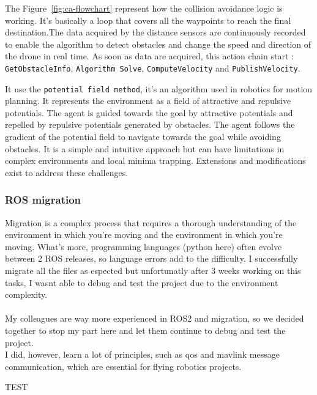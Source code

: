 \hfill \break

The Figure~\ref{fig:ca-flowchart} represent how the collision avoidance logic is working.
It's basically a loop that covers all the waypoints to reach the final destination.The data acquired by the distance sensors are continuously recorded to enable the algorithm to detect obstacles and change the speed and direction of the drone in real time.
As soon as data are acquired, this action chain start : \texttt{GetObstacleInfo}, \texttt{Algorithm Solve}, \texttt{ComputeVelocity} and \texttt{PublishVelocity}.
\newpage

It use the \texttt{potential field method}\cite{potential_field}, it's an algorithm used in robotics for motion planning. It represents the environment as a field of attractive and repulsive potentials. The agent is guided towards the goal by attractive potentials and repelled by repulsive potentials generated by obstacles. The agent follows the gradient of the potential field to navigate towards the goal while avoiding obstacles.
It is a simple and intuitive approach but can have limitations in complex environments and local minima trapping. Extensions and modifications exist to address these challenges.

\subsubsection{ ROS migration}
Migration is a complex process that requires a thorough understanding of the environment in which you're moving and the environment in which you're moving. What's more, programming languages (python here) often evolve between 2 ROS releases, so language errors add to the difficulty.
I successfully migrate all the files as espected but unfortunatly after 3 weeks working on this tasks, I wasnt able to debug and test the project due to the environment complexity.
\\ \\
My colleagues are way more experienced in ROS2 and migration, so we decided together to stop my part here and let them continue to debug and test the project.\\
I did, however, learn a lot of principles, such as \gls{qos} and \gls{mavlink} message communication, which are essential for flying robotics projects.


TEST